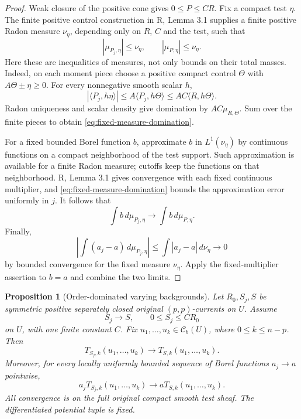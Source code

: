 \documentclass[11pt,a4paper]{article}
\numberwithin{equation}{section}
\newtheorem{proposition}[theorem]{Proposition}
\theoremstyle{definition}
\theoremstyle{remark}
\newcommand{\Cb}{\mathcal C_b}
\begin{document}
\begin{proof}
Weak closure of the positive cone gives $0\leq P\leq CR$.
Fix a compact test $\eta$. The finite positive control construction
in R, Lemma 3.1 supplies a finite positive Radon measure $\nu_\eta$,
depending only on $R$, $C$ and the test, such that
\begin{equation}\label{eq:fixed-measure-domination}
 |\mu_{P_j,\eta}|\leq\nu_\eta,
 \qquad |\mu_{P,\eta}|\leq\nu_\eta.
\end{equation}
Here these are inequalities of measures, not only bounds on their
total masses. Indeed, on each moment piece choose a positive compact
control $\Theta$ with $A\Theta\pm\eta\geq0$. For every nonnegative
smooth scalar $h$,
\[
 |\langle P_j,h\eta\rangle|
 \leq A\langle P_j,h\Theta\rangle
 \leq AC\langle R,h\Theta\rangle.
\]
Radon uniqueness and scalar density give domination by
$AC\mu_{R,\Theta}$. Sum over the finite pieces to obtain
\eqref{eq:fixed-measure-domination}.

For a fixed bounded Borel function $b$, approximate $b$ in
$L^1(\nu_\eta)$ by continuous functions on a compact neighborhood
of the test support. Such approximation is available for a finite
Radon measure; cutoffs keep the functions on that neighborhood.
R, Lemma 3.1 gives convergence with each fixed continuous multiplier,
and \eqref{eq:fixed-measure-domination} bounds the approximation error
uniformly in $j$. It follows that
\[
 \int b\,d\mu_{P_j,\eta}\longrightarrow
 \int b\,d\mu_{P,\eta}.
\]
Finally,
\[
 \left|\int(a_j-a)\,d\mu_{P_j,\eta}\right|
 \leq\int|a_j-a|\,d\nu_\eta\longrightarrow0
\]
by bounded convergence for the fixed measure $\nu_\eta$. Apply the
fixed-multiplier assertion to $b=a$ and combine the two limits.
\end{proof}

\begin{proposition}[Order-dominated varying backgrounds]
\label{prop:dominated-background-stability}
Let $R_0,S_j,S$ be symmetric positive separately closed original
$(p,p)$-currents on $U$. Assume
\[
 S_j\longrightarrow S,
 \qquad 0\leq S_j\leq C R_0
\]
on $U$, with one finite constant $C$. Fix
$u_1,\ldots,u_k\in\Cb(U)$, where $0\leq k\leq n-p$.
Then
\[
 T_{S_j,k}(u_1,\ldots,u_k)
 \longrightarrow T_{S,k}(u_1,\ldots,u_k).
\]
Moreover, for every locally uniformly bounded sequence of Borel
functions $a_j\to a$ pointwise,
\[
 a_jT_{S_j,k}(u_1,\ldots,u_k)
 \longrightarrow aT_{S,k}(u_1,\ldots,u_k).
\]
All convergence is on the full original compact smooth test sheaf.
The differentiated potential tuple is fixed.
\end{proposition}
\end{document}
